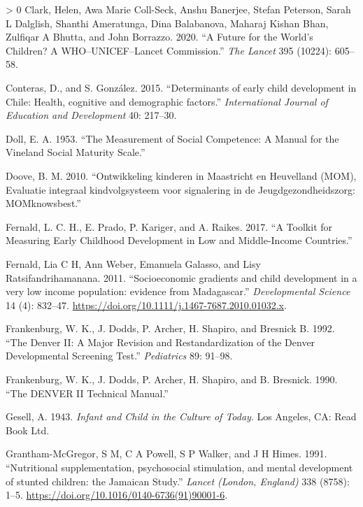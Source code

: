 \documentclass[
]{book}
\newlength{\cslhangindent}
\newenvironment{CSLReferences}[3] %
 {%
  \setlength{\parindent}{0pt}
  \ifodd #1 \everypar{\setlength{\hangindent}{\cslhangindent}}\ignorespaces\fi
  \ifnum #2 > 0
  \setlength{\parskip}{#2\baselineskip}
  \fi
 }%
 {}
\begin{document}
\begin{CSLReferences}{1}{0}
\leavevmode\hypertarget{ref-clark2020}{}%
Clark, Helen, Awa Marie Coll-Seck, Anshu Banerjee, Stefan Peterson, Sarah L Dalglish, Shanthi Ameratunga, Dina Balabanova, Maharaj Kishan Bhan, Zulfiqar A Bhutta, and John Borrazzo. 2020. {``A Future for the World's Children? A WHO--UNICEF--Lancet Commission.''} \emph{The Lancet} 395 (10224): 605--58.

\leavevmode\hypertarget{ref-conteras2015}{}%
Conteras, D., and S. González. 2015. {``{Determinants of early child development in Chile: Health, cognitive and demographic factors.}''} \emph{International Journal of Education and Development} 40: 217--30.

\leavevmode\hypertarget{ref-doll1953}{}%
Doll, E. A. 1953. {``The Measurement of Social Competence: A Manual for the Vineland Social Maturity Scale.''}

\leavevmode\hypertarget{ref-doove2010}{}%
Doove, B. M. 2010. {``{Ontwikkeling kinderen in Maastricht en Heuvelland (MOM), Evaluatie integraal kindvolgsysteem voor signalering in de Jeugdgezondheidszorg: MOMknowsbest.}''}

\leavevmode\hypertarget{ref-fernald2017toolkit}{}%
Fernald, L. C. H., E. Prado, P. Kariger, and A. Raikes. 2017. {``A Toolkit for Measuring Early Childhood Development in Low and Middle-Income Countries.''}

\leavevmode\hypertarget{ref-Fernald2011}{}%
Fernald, Lia C H, Ann Weber, Emanuela Galasso, and Lisy Ratsifandrihamanana. 2011. {``{Socioeconomic gradients and child development in a very low income population: evidence from Madagascar.}''} \emph{Developmental Science} 14 (4): 832--47. \url{https://doi.org/10.1111/j.1467-7687.2010.01032.x}.

\leavevmode\hypertarget{ref-frankenburg1992}{}%
Frankenburg, W. K., J. Dodds, P. Archer, H. Shapiro, and Bresnick B. 1992. {``The Denver II: A Major Revision and Restandardization of the Denver Developmental Screening Test.''} \emph{Pediatrics} 89: 91--98.

\leavevmode\hypertarget{ref-frankenburg1990}{}%
Frankenburg, W. K., J. Dodds, P. Archer, H. Shapiro, and B. Bresnick. 1990. {``The DENVER II Technical Manual.''}

\leavevmode\hypertarget{ref-gesell1943}{}%
Gesell, A. 1943. \emph{Infant and Child in the Culture of Today}. Los Angeles, CA: Read Book Ltd.

\leavevmode\hypertarget{ref-Grantham-McGregor1991}{}%
Grantham-McGregor, S M, C A Powell, S P Walker, and J H Himes. 1991. {``{Nutritional supplementation, psychosocial stimulation, and mental development of stunted children: the Jamaican Study.}''} \emph{Lancet (London, England)} 338 (8758): 1--5. \url{https://doi.org/10.1016/0140-6736(91)90001-6}.


\end{CSLReferences}
\end{document}
